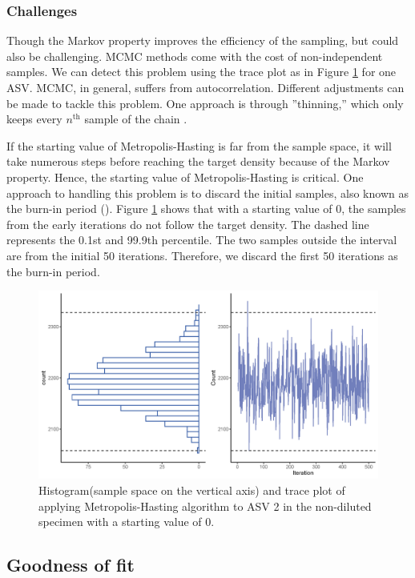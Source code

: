 \documentclass[12pt]{article}
\begin{document}
\subsubsection{Challenges}
Though the Markov property improves the efficiency of the sampling, but could also be challenging. MCMC methods come with the cost of non-independent samples. We can detect this problem using the trace plot as in Figure \ref{fig:trace} for one ASV. MCMC, in general, suffers from autocorrelation. Different adjustments can be made to tackle this problem. One approach is through ”thinning,”  which only keeps every $n^{\text{th}}$ sample of the chain \citep{link2012thinning}.  

If the starting value of Metropolis-Hasting is far from the sample space, it will take numerous steps before reaching the target density because of the Markov property. Hence, the starting value of Metropolis-Hasting is critical.  One approach to handling this problem is to discard the initial samples, also known as the burn-in period (\cite{gelman1995bayesian}). Figure \ref{fig:trace} shows that with a starting value of 0, the samples from the early iterations do not follow the target density. The dashed line represents the 0.1st and 99.9th percentile. The two samples outside the interval are from the initial 50 iterations. Therefore, we discard the first 50 iterations as the burn-in period. 

\begin{figure}[H]
	\centering
	\includegraphics[width=\textwidth]{hist_trace.png}
	\caption{Histogram(sample space on the vertical axis) and trace plot of applying Metropolis-Hasting algorithm to ASV 2 in the non-diluted specimen with a starting value of 0.}
	\label{fig:trace}     
\end{figure}

\subsection{Goodness of fit}
\end{document}
